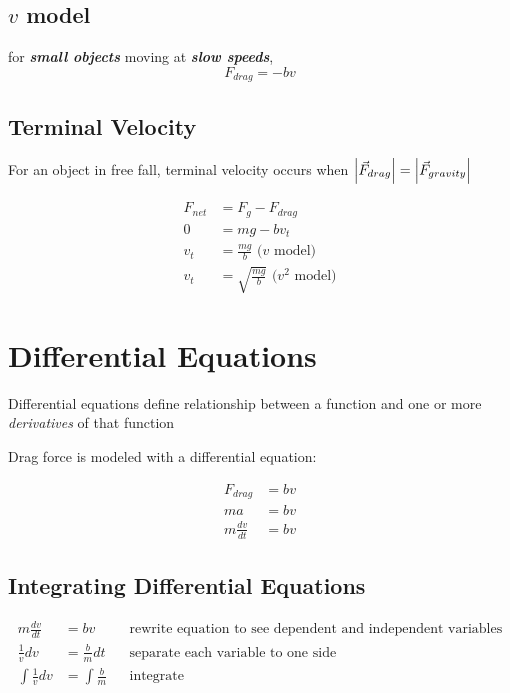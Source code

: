 \documentclass[titlepage]{article}
\begin{document}
\subsection{$v$ model}
for \textbf{\emph{small objects}} moving at \textbf{\emph{slow speeds}},
\[F_{drag} = -bv\]

\subsection{Terminal Velocity}
For an object in free fall, terminal velocity occurs when $\abs{\vec{F}_{drag}} = \abs{\vec{F}_{gravity}}$

\begin{align*}
    F_{net} & = F_g - F_{drag}                             \\
    0       & = mg - bv_t                                  \\
    v_t     & = \frac{mg}{b} \text{ ($v$ model)}           \\
    v_t     & = \sqrt {\frac{mg}{b}} \text{ ($v^2$ model)}
\end{align*}

\section{Differential Equations}
Differential equations define relationship between a function and one or more \emph{derivatives} of that function

Drag force is modeled with a differential equation:

\begin{align*}
    F_{drag}        & = bv \\
    ma              & = bv \\
    m \frac{dv}{dt} & = bv
\end{align*}

\subsection{Integrating Differential Equations}
\begin{align*}
    m \frac{dv}{dt}     & = bv               &  & \text{rewrite equation to see dependent and independent variables} \\
    \frac{1}{v} dv      & = \frac{b}{m} dt   &  & \text{separate each variable to one side}                          \\
    \int \frac{1}{v} dv & = \int \frac{b}{m} &  & \text{integrate}
\end{align*}
\end{document}
